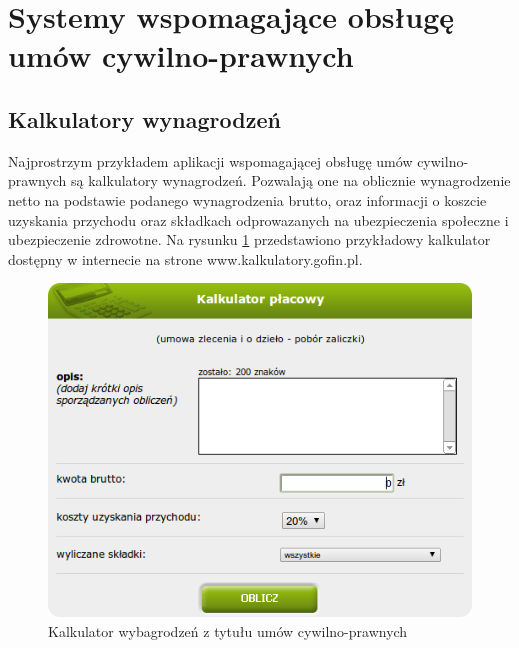 \section[Systemy wspomagające obsługę umów cywilno-prawnych][Systemy wspomagające obsługę umów cywilno-prawnych]{Systemy wspomagające obsługę umów cywilno-prawnych}

\subsection[Kalkulatory wynagrodzeń][Kalkulatory wynagrodzeń]{Kalkulatory wynagrodzeń}
Najprostrzym przykładem aplikacji wspomagającej obsługę umów cywilno-prawnych są kalkulatory wynagrodzeń. Pozwalają one na oblicznie wynagrodzenie netto na podstawie podanego wynagrodzenia brutto, oraz informacji o koszcie uzyskania przychodu oraz składkach odprowazanych na ubezpieczenia społeczne i ubezpieczenie zdrowotne. Na rysunku \ref{kalkulator} przedstawiono przykładowy kalkulator dostępny w internecie na strone www.kalkulatory.gofin.pl.

\begin{figure}[tdh]
    \begin{center}
	\includegraphics[scale=.6]{img/kalkulator.png}
	\caption{Kalkulator wybagrodzeń z tytułu umów cywilno-prawnych}
	\label{kalkulator}
    \end{center}
\end{figure}

